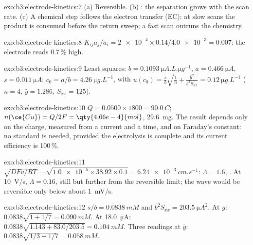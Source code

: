 \begin{solution}{exo:b3:electrode-kinetics:7}
(a) Reversible. (b) : the separation grows with the scan rate.
(c) A chemical step follows the electron transfer (EC): at slow scans the
product is consumed before the return sweep; a fast scan outruns the chemistry.
\end{solution}

\begin{solution}{exo:b3:electrode-kinetics:8}
$K_{ij}a_j/a_i = \num{2e-4} \times 0.14/\num{4.0e-3} = 0.007$: the electrode reads 0.7\,\% high.
\end{solution}

\begin{solution}{exo:b3:electrode-kinetics:9}
Least squares: $b = \qty{0.1093}{\micro A.L.\micro g^{-1}}$, $a = \qty{0.466}{\micro A}$, $s = \qty{0.011}{\micro A}$; $c_0 = a/b =
\qty{4.26}{\micro g.L^{-1}}$, with $u(c_0) = \frac sb\sqrt{\frac1n + \frac{\bar y^2}{b^2S_{xx}}} = \qty{0.12}{\micro g.L^{-1}}$
($n = 4$, $\bar y = 1.286$, $S_{xx} = 125$).
\end{solution}

\begin{solution}{exo:b3:electrode-kinetics:10}
$Q = 0.0500 \times 1800 = \qty{90.0}{C}$; $n(\ce{Cu}) = Q/2F = \qty{4.66e-4}{mol}$, \qty{29.6}{mg}. The
result depends only on the charge, measured from a current and a time, and on
Faraday's constant: no standard is needed, provided the electrolysis is
complete and its current efficiency is 100\,\%.
\end{solution}

\begin{solution}{exo:b3:electrode-kinetics:11}
$\sqrt{DFv/RT} = \sqrt{\num{1.0e-5} \times 38.92 \times 0.1} = \qty{6.24e-3}{cm.s^{-1}}$: $\Lambda = 1.6$, .
At \qty{10}{V/s}, $\Lambda = 0.16$, still  but further from the reversible
limit; the wave would be reversible only below about \qty{1}{mV/s}.
\end{solution}

\begin{solution}{exo:b3:electrode-kinetics:12}
$s/b = \qty{0.0838}{mM}$ and $b^2S_{xx} = \qty{203.5}{\micro A^2}$. At $\bar y$: $0.0838\sqrt{1 + 1/7} = \qty{0.090}{mM}$.
At \qty{18.0}{\micro A}: $0.0838\sqrt{1.143 + 83.0/203.5} = \qty{0.104}{mM}$. Three readings at $\bar y$:
$0.0838\sqrt{1/3 + 1/7} = \qty{0.058}{mM}$.
\end{solution}


